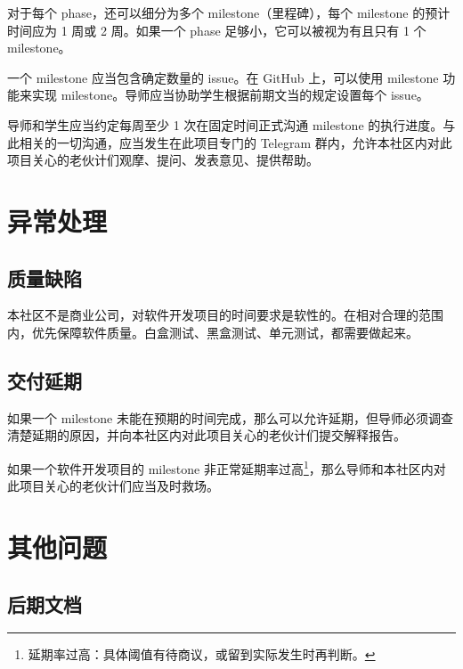 对于每个 phase，还可以细分为多个 milestone（里程碑），每个 milestone 的预计时间应为 1 周或 2 周。如果一个 phase 足够小，它可以被视为有且只有 1 个 milestone。

一个 milestone 应当包含确定数量的 issue。在 GitHub 上，可以使用 milestone 功能来实现 milestone。导师应当协助学生根据前期文当的规定设置每个 issue。

导师和学生应当约定每周至少 1 次在固定时间正式沟通 milestone 的执行进度。与此相关的一切沟通，应当发生在此项目专门的 Telegram 群内，允许本社区内对此项目关心的老伙计们观摩、提问、发表意见、提供帮助。











\section{异常处理}

\subsection{质量缺陷}

本社区不是商业公司，对软件开发项目的时间要求是软性的。在相对合理的范围内，优先保障软件质量。白盒测试、黑盒测试、单元测试，都需要做起来。

\subsection{交付延期}

如果一个 milestone 未能在预期的时间完成，那么可以允许延期，但导师必须调查清楚延期的原因，并向本社区内对此项目关心的老伙计们提交解释报告。

如果一个软件开发项目的 milestone 非正常延期率过高\footnote{延期率过高：具体阈值有待商议，或留到实际发生时再判断。}，那么导师和本社区内对此项目关心的老伙计们应当及时救场。















\section{其他问题}

\subsection{后期文档}

